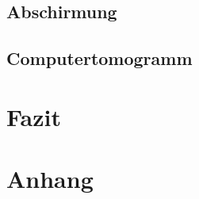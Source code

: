 \documentclass{article}
\begin{document}
\subsection{Abschirmung}


\subsection{Computertomogramm}


\section{Fazit}


\section{Anhang}

\newpage
\printbibliography[heading=bibintoc]
\end{document}
